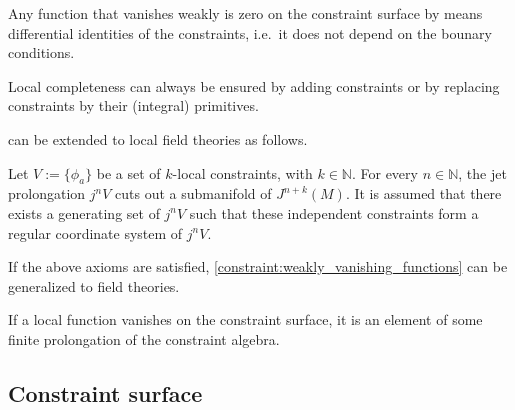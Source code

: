     \begin{axiom}
        Any function that vanishes weakly is zero on the constraint surface by means differential identities of the constraints, i.e.~it does not depend on the bounary conditions.
    \end{axiom}
    \begin{remark}
        Local completeness can always be ensured by adding constraints or by replacing constraints by their (integral) primitives.
    \end{remark}

     can be extended to local field theories as follows.
    \begin{axiom}
        Let $V:=\{\phi_a\}$ be a set of $k$-local constraints, with $k\in\mathbb{N}$. For every $n\in\mathbb{N}$, the jet prolongation $j^nV$ cuts out a submanifold of $J^{n+k}(M)$. It is assumed that there exists a generating set of $j^nV$ such that these independent constraints form a regular coordinate system of $j^nV$.
    \end{axiom}

    If the above axioms are satisfied, \cref{constraint:weakly_vanishing_functions} can be generalized to field theories.
    \begin{property}
        If a local function vanishes on the constraint surface, it is an element of some finite prolongation of the constraint algebra.
    \end{property}

\subsection{Constraint surface}

